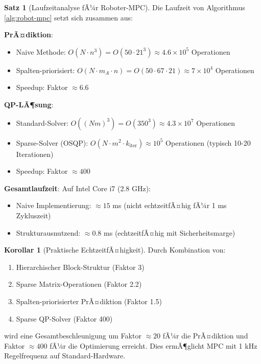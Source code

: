 ﻿\documentclass[a4paper,12pt]{report}
\theoremstyle{definition}
\newtheorem{satz}{Satz}
\newtheorem{korollar}{Korollar}
\begin{document}
	\begin{satz}[Laufzeitanalyse fÃ¼r Roboter-MPC]
		Die Laufzeit von Algorithmus \ref{alg:robot-mpc} setzt sich zusammen aus:
		
		\textbf{PrÃ¤diktion}:
		\begin{itemize}
			\item Naive Methode: $O(N \cdot n^3) = O(50 \cdot 21^3) \approx 4.6 \times 10^5$ Operationen
			\item Spalten-priorisiert: $O(N \cdot m_A \cdot n) = O(50 \cdot 67 \cdot 21) \approx 7 \times 10^4$ Operationen
			\item Speedup: Faktor $\approx 6.6$
		\end{itemize}
		
		\textbf{QP-LÃ¶sung}:
		\begin{itemize}
			\item Standard-Solver: $O((Nm)^3) = O(350^3) \approx 4.3 \times 10^7$ Operationen
			\item Sparse-Solver (OSQP): $O(N \cdot m^2 \cdot k_{\text{iter}}) \approx 10^5$ Operationen (typisch 10-20 Iterationen)
			\item Speedup: Faktor $\approx 400$
		\end{itemize}
		
		\textbf{Gesamtlaufzeit}:
		Auf Intel Core i7 (2.8 GHz):
		\begin{itemize}
			\item Naive Implementierung: $\approx 15$ ms (nicht echtzeitfÃ¤hig fÃ¼r 1 ms Zykluszeit)
			\item Strukturausnutzend: $\approx 0.8$ ms (echtzeitfÃ¤hig mit Sicherheitsmarge)
		\end{itemize}
	\end{satz}
	
	\begin{korollar}[Praktische EchtzeitfÃ¤higkeit]
		Durch Kombination von:
		\begin{enumerate}
			\item Hierarchischer Block-Struktur (Faktor 3)
			\item Sparse Matrix-Operationen (Faktor 2.2)
			\item Spalten-priorisierter PrÃ¤diktion (Faktor 1.5)
			\item Sparse QP-Solver (Faktor 400)
		\end{enumerate}
		
		wird eine Gesamtbeschleunigung um Faktor $\approx 20$ fÃ¼r die PrÃ¤diktion und Faktor $\approx 400$ fÃ¼r die Optimierung erreicht. Dies ermÃ¶glicht MPC mit 1 kHz Regelfrequenz auf Standard-Hardware.
	\end{korollar}
	
\end{document}
